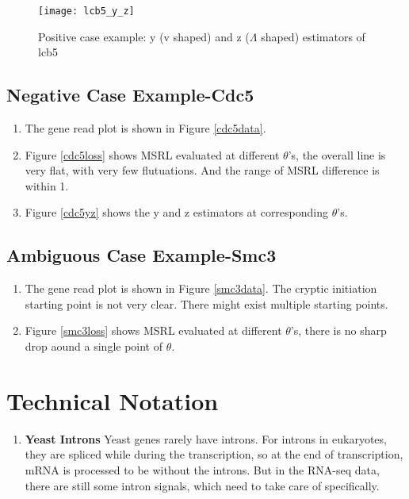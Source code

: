 \documentclass{article}
\begin{document}
\begin{figure}[h]
	\texttt{[image: lcb5\_y\_z]}
	\caption{Positive case example: y (v shaped) and z ($\Lambda$ shaped) estimators of lcb5}
	\label{lcb5yz}
\end{figure}




\subsection{Negative Case Example-Cdc5}

\begin{enumerate}
	\item The gene read plot is shown in Figure \ref{cdc5data}.
	\item Figure \ref{cdc5loss} shows MSRL evaluated at different $\theta$'s, the overall line is very flat, with very few flutuations. And the range of MSRL difference is within 1. 
	\item Figure \ref{cdc5yz} shows the y and z estimators at corresponding $\theta$'s. 
\end{enumerate}



\subsection{Ambiguous Case Example-Smc3}

\begin{enumerate}
	\item The gene read plot is shown in Figure \ref{smc3data}. The cryptic initiation starting point is not very clear. There might exist multiple starting points. 
	\item Figure \ref{smc3loss} shows MSRL evaluated at different $\theta$'s, there is no sharp drop aound a single point of $\theta$. 
\end{enumerate}




\newpage
\section{Technical Notation}
\begin{enumerate}
	\item \textbf{Yeast Introns} Yeast genes rarely have introns. For introns in eukaryotes, they are spliced while during the transcription, so at the end of transcription, mRNA is processed to be without the introns. But in the RNA-seq data, there are still some intron signals, which need to take care of specifically.
\end{enumerate}
\end{document}
